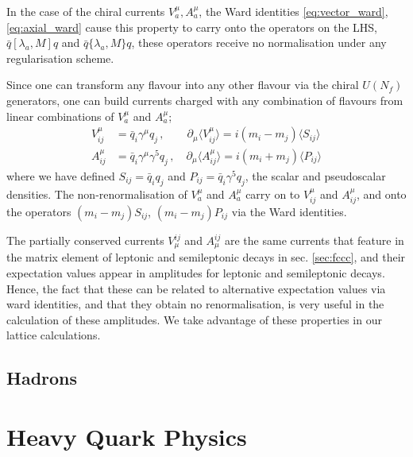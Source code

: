 In the case of the chiral currents $V_a^{\mu},A_a^{\mu}$, the Ward identities \eqref{eq:vector_ward}, \eqref{eq:axial_ward} cause this property to carry onto the operators on the LHS, $\bar{q} [\lambda_a,M] q$ and $\bar{q} \{ \lambda_a,M \} q$, these operators receive no normalisation under any regularisation scheme.

Since one can transform any flavour into any other flavour via the chiral $U(N_f)$ generators, one can build currents charged with any combination of flavours from linear combinations of $V_a^{\mu}$ and $A_a^{\mu}$;
\begin{align}
  \label{eq:vector_ward_indiv}
  V_{ij}^{\mu} &= \bar{q}_i \gamma^{\mu} q_j \,,\quad\quad \partial_{\mu}\langle V^{\mu}_{ij} \rangle = i ( m_i - m_j ) \langle S_{ij} \rangle \\
  A_{ij}^{\mu} &= \bar{q}_i \gamma^{\mu}\gamma^5 q_j \,,\quad \partial_{\mu}\langle A^{\mu}_{ij} \rangle = i ( m_i + m_j ) \langle P_{ij} \rangle
  \label{eq:axial_ward_indiv}
\end{align}
where we have defined $S_{ij} = \bar{q}_iq_j$ and $P_{ij} = \bar{q}_i\gamma^5 q_j$, the scalar and pseudoscalar densities. The non-renormalisation of $V_a^{\mu}$ and $A_a^{\mu}$ carry on to $V_{ij}^{\mu}$ and $A_{ij}^{\mu}$, and onto the operators $( m_i - m_j ) S_{ij}$, $( m_i - m_j ) P_{ij}$ via the Ward identities.

The partially conserved currents $V^{ij}_{\mu}$ and $A^{ij}_{\mu}$ are the same currents that feature in the matrix element of leptonic and semileptonic decays in sec. \ref{sec:fccc}, and their expectation values appear in amplitudes for leptonic and semileptonic decays. Hence, the fact that these can be related to alternative expectation values via ward identities, and that they obtain no renormalisation, is very useful in the calculation of these amplitudes. We take advantage of these properties in our lattice calculations.

\subsection{Hadrons}

{}

\section{Heavy Quark Physics}

